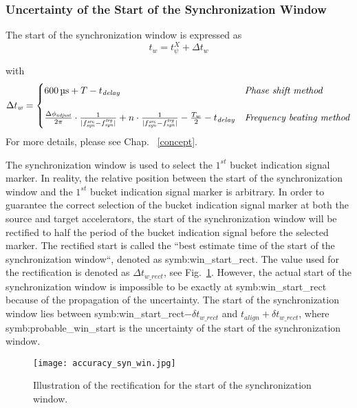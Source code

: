 \subsubsection{Uncertainty of the Start of the Synchronization Window}
\label{cal_start}
The start of the synchronization window is expressed as 
\begin{equation}
t_\mathit{w}=t_\psi^\mathit{X}+\Delta t_\mathit{w}\label{syn_win_start2}
\end{equation}

with 
\begin{eqnarray}
\Delta t_\mathit{w}=
\begin{cases}
\SI{600}{\us}+T-t_\mathit{delay}\ &\textit{Phase shift method}\cr
\cr
\frac{\Delta \phi_\mathit{adjust}}{2\pi}\cdot\frac{1}{|f_{\mathit{syn}}^\mathit{src}-f_{\mathit{syn}}^\mathit{trg}|}+n\cdot \frac{1}{|f_{\mathit{syn}}^\mathit{src}-f_{\mathit{syn}}^\mathit{trg}|}-\frac{T_w}{2}-t_\mathit{delay} & \textit{Frequency beating method}\cr
\end{cases}
\end{eqnarray}
For more details, please see Chap. ~\ref{concept}.

The synchronization window is used to select the $1^\mathit{st}$ bucket indication signal marker. In reality, the relative position between the start of the synchronization window and the $1^\mathit{st}$ bucket indication signal marker is arbitrary. In order to guarantee the correct selection of the bucket indication signal marker at both the source and target accelerators, the start of the synchronization window will be rectified to half the period of the bucket indication signal before the selected marker. The rectified start is called the ``best estimate time of the start of the synchronization window``, denoted as \gls{symb:win_start_rect}. The value used for the rectification is denoted as $\Delta t_\mathit{w\_rect}$, see Fig.~\ref{accuracy_syn_win}. However, the actual start of the synchronization window is impossible to be exactly at \gls{symb:win_start_rect} because of the propagation of the uncertainty. The start of the synchronization window lies between \gls{symb:win_start_rect}$-\delta t_\mathit{w\_rect}$ and $t_\mathit{align}+\delta t_\mathit{w\_rect}$, where \gls{symb:probable_win_start} is the uncertainty of the start of the synchronization window. 
\begin{figure}[!htb]
   \centering   
   \texttt{[image: accuracy\_syn\_win.jpg]}
   \caption{Illustration of the rectification for the start of the synchronization window.}
   \label{accuracy_syn_win}
\end{figure}


